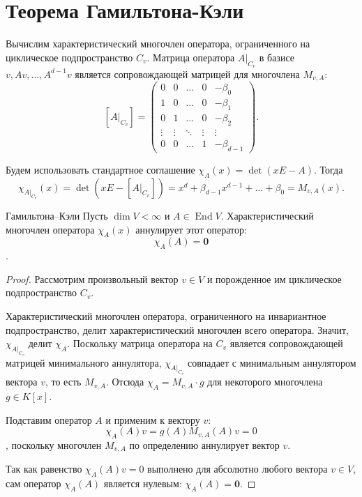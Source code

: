 
\section{Теорема Гамильтона-Кэли}

Вычислим характеристический многочлен оператора, ограниченного на циклическое подпространство $C_v$. Матрица оператора $A|_{C_v}$ в базисе $v, Av, \dots, A^{d-1}v$
является сопровождающей матрицей для многочлена $M_{v,A}$:
\[
[A|_{C_v}] =
\begin{pmatrix}
	0 & 0 & \dots & 0 & -\beta_0 \\
	1 & 0 & \dots & 0 & -\beta_1 \\
	0 & 1 & \dots & 0 & -\beta_2 \\
	\vdots & \vdots & \ddots & \vdots & \vdots \\
	0 & 0 & \dots & 1 & -\beta_{d-1}
\end{pmatrix}.
\]

Будем использовать стандартное соглашение $\chi_A(x) = \det(xE - A).$
Тогда
\[
\chi_{A|_{C_v}}(x)
=
\det(xE - [A|_{C_v}])
=
x^d + \beta_{d-1}x^{d-1} + \dots + \beta_0
=
M_{v,A}(x).
\]

\begin{Theorem}{Гамильтона--Кэли}{}
	Пусть $\dim V < \infty$ и $A \in \operatorname{End} V$. Характеристический многочлен оператора $\chi_A(x)$ аннулирует этот оператор:
	\[
	\chi_A(A) = \mathbf{0}
	\].
\end{Theorem}

\begin{proof}
	Рассмотрим произвольный вектор $v \in V$ и порожденное им циклическое подпространство $C_v$.

	Характеристический многочлен оператора, ограниченного на инвариантное подпространство, делит характеристический многочлен всего оператора. Значит, $\chi_{A|_{C_v}}$ делит $\chi_A$.
	Поскольку матрица оператора на $C_v$ является сопровождающей матрицей минимального аннулятора, $\chi_{A|_{C_v}}$ совпадает с минимальным аннулятором вектора $v$, то есть $M_{v,A}$. Отсюда $\chi_A = M_{v,A} \cdot g$ для некоторого многочлена $g \in K[x]$.

	Подставим оператор $A$ и применим к вектору $v$:
	\[
	\chi_A(A)v = g(A)M_{v,A}(A)v = 0
	\],
	поскольку многочлен $M_{v,A}$ по определению аннулирует вектор $v$.

	Так как равенство $\chi_A(A)v = 0$ выполнено для абсолютно любого вектора $v \in V$, сам оператор $\chi_A(A)$ является нулевым: $\chi_A(A) = \mathbf{0}$.
\end{proof}
